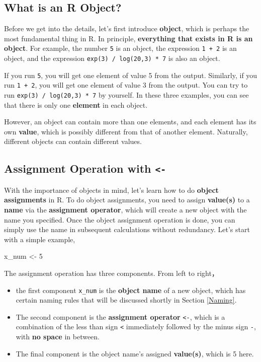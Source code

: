 \documentclass[
]{book}
\newenvironment{Shaded}{\begin{snugshade}}{\end{snugshade}}
\newcommand{\DecValTok}[1]{\textcolor[rgb]{0.00,0.00,0.81}{#1}}
\newcommand{\NormalTok}[1]{#1}
\newcommand{\OtherTok}[1]{\textcolor[rgb]{0.56,0.35,0.01}{#1}}
\providecommand{\tightlist}{%
  \setlength{\itemsep}{0pt}\setlength{\parskip}{0pt}}
\begin{document}
\hypertarget{what-is-an-r-object}{%
\subsection{What is an R Object?}\label{what-is-an-r-object}}

Before we get into the details, let's first introduce \textbf{object}, which is perhaps the most fundamental thing in R. In principle, \textbf{everything that exists in R is an object}. For example, the number \texttt{5} is an object, the expression \texttt{1\ +\ 2} is an object, and the expression \texttt{exp(3)\ /\ log(20,3)\ *\ 7} is also an object.

If you run \texttt{5}, you will get one element of value 5 from the output. Similarly, if you run \texttt{1\ +\ 2}, you will get one element of value 3 from the output. You can try to run \texttt{exp(3)\ /\ log(20,3)\ *\ 7} by yourself. In these three examples, you can see that there is only one \textbf{element} in each object.

However, an object can contain more than one elements, and each element has its own \textbf{value}, which is possibly different from that of another element. Naturally, different objects can contain different values.

\hypertarget{assignment}{%
\subsection{\texorpdfstring{Assignment Operation with \texttt{\textless{}-}}{Assignment Operation with \textless-}}\label{assignment}}

With the importance of objects in mind, let's learn how to do \textbf{object assignments} in R. To do object assignments, you need to assign \textbf{value(s)} to a \textbf{name} via the \textbf{assignment operator}, which will create a new object with the name you specified. Once the object assignment operation is done, you can simply use the name in subsequent calculations without redundancy. Let's start with a simple example,

\begin{Shaded}
\begin{Highlighting}[]
\NormalTok{x\_num }\OtherTok{\textless{}{-}} \DecValTok{5}
\end{Highlighting}
\end{Shaded}

The assignment operation has three components. From left to right，

\begin{itemize}
\tightlist
\item
  the first component \texttt{x\_num} is the \textbf{object name} of a new object, which has certain naming rules that will be discussed shortly in Section \ref{Naming}.
\item
  The second component is the \textbf{assignment operator} \texttt{\textless{}-}, which is a combination of the less than sign \texttt{\textless{}} immediately followed by the minus sign \texttt{-}, with \textbf{no space} in between.
\item
  The final component is the object name's assigned \textbf{value(s)}, which is 5 here.
\end{itemize}
\end{document}
